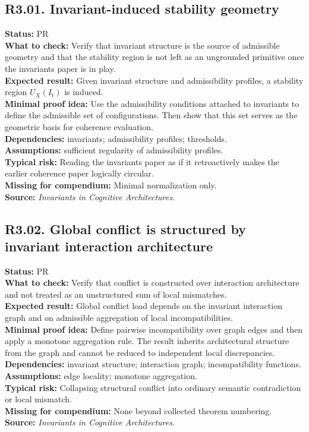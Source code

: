 \documentclass[12pt]{article}
\begin{document}
	\subsection*{R3.01. Invariant-induced stability geometry}
	\textbf{Status:} PR \\
	\textbf{What to check:} Verify that invariant structure is the source of admissible geometry and that the stability region is not left as an ungrounded primitive once the invariants paper is in play. \\
	\textbf{Expected result:} Given invariant structure and admissibility profiles, a stability region $U_X(I_t)$ is induced. \\
	\textbf{Minimal proof idea:} Use the admissibility conditions attached to invariants to define the admissible set of configurations. Then show that this set serves as the geometric basis for coherence evaluation. \\
	\textbf{Dependencies:} invariants; admissibility profiles; thresholds. \\
	\textbf{Assumptions:} sufficient regularity of admissibility profiles. \\
	\textbf{Typical risk:} Reading the invariants paper as if it retroactively makes the earlier coherence paper logically circular. \\
	\textbf{Missing for compendium:} Minimal normalization only. \\
	\textbf{Source:} \emph{Invariants in Cognitive Architectures}.
	
	\subsection*{R3.02. Global conflict is structured by invariant interaction architecture}
	\textbf{Status:} PR \\
	\textbf{What to check:} Verify that conflict is constructed over interaction architecture and not treated as an unstructured sum of local mismatches. \\
	\textbf{Expected result:} Global conflict load depends on the invariant interaction graph and on admissible aggregation of local incompatibilities. \\
	\textbf{Minimal proof idea:} Define pairwise incompatibility over graph edges and then apply a monotone aggregation rule. The result inherits architectural structure from the graph and cannot be reduced to independent local discrepancies. \\
	\textbf{Dependencies:} invariant structure; interaction graph; incompatibility functions. \\
	\textbf{Assumptions:} edge locality; monotone aggregation. \\
	\textbf{Typical risk:} Collapsing structural conflict into ordinary semantic contradiction or local mismatch. \\
	\textbf{Missing for compendium:} None beyond collected theorem numbering. \\
	\textbf{Source:} \emph{Invariants in Cognitive Architectures}.
	
\end{document}
